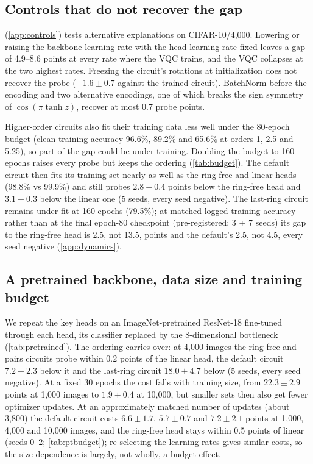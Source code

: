 \subsection{Controls that do not recover the gap}
\label{sec:controls}



 (\cref{app:controls}) tests alternative explanations on CIFAR-10/4,000. Lowering or raising the
backbone learning rate with the head learning rate fixed leaves a gap of 4.9--8.6 points at
every rate where the VQC trains, and the VQC collapses at the two highest rates. Freezing the circuit's
rotations at initialization does not recover the probe ($-1.6\pm0.7$ against the trained circuit). BatchNorm before the encoding
and two alternative encodings, one of which breaks the sign symmetry of
$\cos(\pi\tanh z)$, recover at most 0.7 probe points.

Higher-order circuits also fit their training data less well under the 80-epoch budget
(clean training accuracy 96.6\%, 89.2\% and 65.6\% at orders 1, 2.5 and 5.25), so part of the gap could be under-training. Doubling the budget
to 160 epochs raises every probe but keeps the ordering (\cref{tab:budget}). The default circuit then fits its training set nearly as well as
the ring-free and linear heads (98.8\% vs 99.9\%) and still probes $2.8\pm0.4$ points below
the ring-free head and $3.1\pm0.3$ below the linear one (5 seeds, every seed negative). The
last-ring circuit remains under-fit at 160 epochs (79.5\%); at matched logged training accuracy rather than at the final epoch-80 checkpoint (pre-registered; 3 + 7 seeds) its gap to the ring-free head is 2.5, not 13.5, points and the default's 2.5, not 4.5, every seed negative (\cref{app:dynamics}).

\subsection{A pretrained backbone, data size and training budget}
\label{sec:pretrained}


We repeat the key heads on
an ImageNet-pretrained ResNet-18 fine-tuned through each head, its classifier replaced by the
8-dimensional bottleneck (\cref{tab:pretrained}). The ordering carries over: at 4,000 images
the ring-free and pairs circuits probe within 0.2 points of the linear head, the default
circuit $7.2\pm2.3$ below it and the last-ring circuit $18.0\pm4.7$ below (5 seeds, every seed
negative). At a fixed 30
epochs the cost falls with training size, from $22.3\pm2.9$ points at 1,000 images to
$1.9\pm0.4$ at 10,000, but smaller sets then also get fewer optimizer updates. At an
approximately matched number of updates (about 3,800) the default circuit costs $6.6\pm1.7$,
$5.7\pm0.7$ and $7.2\pm2.1$ points at 1,000, 4,000 and 10,000 images, and the ring-free head
stays within 0.5 points of linear (seeds 0--2; \cref{tab:ptbudget}); re-selecting the learning
rates gives similar costs, so the size dependence is largely, not wholly, a budget effect.

